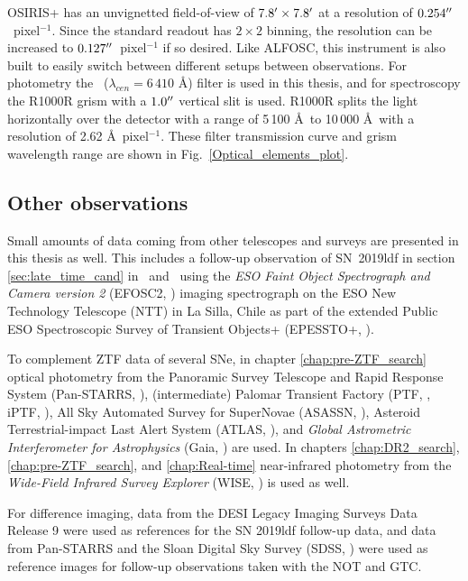 \documentclass[a4paper,oneside,12pt, class=Latex/Classes/PhDthesisPSnPDF, crop=false]{standalone}
\begin{document}
OSIRIS+ has an unvignetted field-of-view of $7.8^{\prime}\times7.8^{\prime}$ at a resolution of $0.254^{\prime\prime}$~pixel$^{-1}$. Since the standard readout has $2\times2$ binning, the resolution can be increased to $0.127^{\prime\prime}$~pixel$^{-1}$ if so desired. Like ALFOSC, this instrument is also built to easily switch between different setups between observations. For photometry the \ztfr~($\lambda_{cen} =6\,410$ \AA) filter is used in this thesis, and for spectroscopy the R1000R grism with a $1.0^{\prime\prime}$ vertical slit is used. R1000R splits the light horizontally over the detector with a range of 5\,100 \AA\ to 10\,000 \AA\ with a resolution of 2.62 \AA\ pixel$^{-1}$. These filter transmission curve and grism wavelength range are shown in Fig.~\ref{Optical_elements_plot}.


\subsection{Other observations}
Small amounts of data coming from other telescopes and surveys are presented in this thesis as well. This includes a follow-up observation of SN~2019ldf in section \ref{sec:late_time_cand} in \ztfg\ and \ztfr\ using the \textit{ESO Faint Object Spectrograph and Camera version 2} (EFOSC2, \citealt{EFOSC2}) imaging spectrograph on the ESO New Technology Telescope (NTT) in La Silla, Chile as part of the extended Public ESO Spectroscopic Survey of Transient Objects+ (EPESSTO+, \citealt{PESSTO}).

To complement ZTF data of several SNe, in chapter \ref{chap:pre-ZTF_search} optical photometry from the Panoramic Survey Telescope and Rapid Response System (Pan-STARRS, \citealt{Pan-STARRS1}), (intermediate) Palomar Transient Factory (PTF, \citealt{PTF_1, PTF_2}, iPTF, \citealt{iPTF}), All Sky Automated Survey for SuperNovae (ASASSN, \citealt{ASASSN_paper1, ASASSN_catalog}), Asteroid Terrestrial-impact Last Alert System (ATLAS, \citealt{ATLAS}), and \textit{Global Astrometric Interferometer for Astrophysics} (Gaia, \citealt{Gaia}) are used. In chapters \ref{chap:DR2_search}, \ref{chap:pre-ZTF_search}, and \ref{chap:Real-time} near-infrared photometry from the \textit{Wide-Field Infrared Survey Explorer} (WISE, \citealt{WISE}) is used as well.

For difference imaging, data from the DESI Legacy Imaging Surveys Data Release 9 \citep{DESI-Legacy_Imaging_Surveys} were used as references for the SN 2019ldf follow-up data, and data from Pan-STARRS and the Sloan Digital Sky Survey (SDSS, \citealt{SDSS-I-II, SDSS_DR4, SDSS_telescope, SDSS_Spectograph}) were used as reference images for follow-up observations taken with the NOT and GTC.
\end{document}
